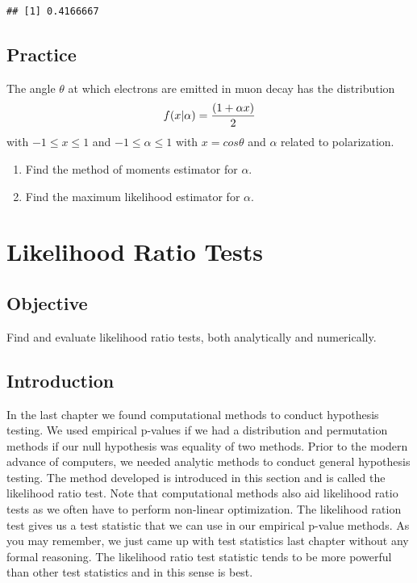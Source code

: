 \documentclass[]{book}
\providecommand{\tightlist}{%
  \setlength{\itemsep}{0pt}\setlength{\parskip}{0pt}}
\theoremstyle{definition}
\theoremstyle{definition}
\theoremstyle{definition}
\theoremstyle{remark}
\begin{document}
\begin{verbatim}
## [1] 0.4166667
\end{verbatim}

\subsection{Practice}\label{practice-10}

The angle \(\theta\) at which electrons are emitted in muon decay has
the distribution\\
\[f(x|\alpha)={(1+\alpha x) \over 2}\] with \(-1 \leq x \leq 1\) and
\(-1 \leq \alpha \leq 1\) with \(x=cos \theta\) and \(\alpha\) related
to polarization.

\begin{enumerate}
\def\labelenumi{\arabic{enumi}.}
\tightlist
\item
  Find the method of moments estimator for \(\alpha\).\\
\item
  Find the maximum likelihood estimator for \(\alpha\).
\end{enumerate}

\hypertarget{LRT}{\section{Likelihood Ratio Tests}\label{LRT}}

\subsection{Objective}\label{objective}

Find and evaluate likelihood ratio tests, both analytically and
numerically.

\subsection{Introduction}\label{introduction-4}

In the last chapter we found computational methods to conduct hypothesis
testing. We used empirical p-values if we had a distribution and
permutation methods if our null hypothesis was equality of two methods.
Prior to the modern advance of computers, we needed analytic methods to
conduct general hypothesis testing. The method developed is introduced
in this section and is called the likelihood ratio test. Note that
computational methods also aid likelihood ratio tests as we often have
to perform non-linear optimization. The likelihood ration test gives us
a test statistic that we can use in our empirical p-value methods. As
you may remember, we just came up with test statistics last chapter
without any formal reasoning. The likelihood ratio test statistic tends
to be more powerful than other test statistics and in this sense is
best.
\end{document}
